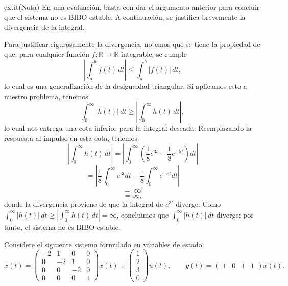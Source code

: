\documentclass[
  11pt,
  letterpaper,
   addpoints,
   answers
  ]{exam}
\begin{document}
\begin{questions}
\begin{solution}
	extit{(Nota)} En una evaluación, basta con dar el argumento anterior para concluir que el sistema no es BIBO-estable. A continuación, se justifica brevemente la divergencia de la integral.

Para justificar rigurosamente la divergencia, notemos que se tiene la propiedad de que, para cualquier función $f:\mathbb{R}\to\mathbb{R}$ integrable, se cumple
\begin{equation}
\left|\int_{a}^{b} f(t)\,dt\right|
\le
\int_{a}^{b} |f(t)|\,dt,
\end{equation}
lo cual es una generalización de la desigualdad triangular. Si aplicamos esto a nuestro problema, tenemos
\begin{equation}
\int_{0}^{\infty} |h(t)|\,dt
\ge
\left|\int_{0}^{\infty} h(t)\,dt\right|,
\end{equation}
lo cual nos entrega una cota inferior para la integral deseada. Reemplazando la respuesta al impulso en esta cota, tenemos
\begin{equation}
\left|\int_{0}^{\infty} h(t)\,dt\right|
=
\left|\int_{0}^{\infty} \left(\frac{1}{8}e^{3t}-\frac{1}{8}e^{-5t}\right) dt \right|
\end{equation}
\begin{equation}
=
\left|\frac{1}{8}\int_{0}^{\infty} e^{3t} dt - \frac{1}{8}\int_{0}^{\infty} e^{-5t} dt \right|
\end{equation}
\begin{equation}
=\left| \infty \right|
\end{equation}
\begin{equation}
=\infty,
\end{equation}
donde la divergencia proviene de que la integral de $e^{3t}$ diverge. Como $\int_{0}^{\infty} |h(t)|\,dt \ge \left|\int_{0}^{\infty} h(t)\,dt\right| = \infty$, concluimos que $\int_{0}^{\infty} |h(t)|\,dt$ diverge; por tanto, el sistema no es BIBO-estable.
\end{solution}
\question Considere el siguiente sistema formulado en variables de estado:
\begin{equation}
  \dot{x}(t) =
  \begin{pmatrix}
    -2 & 1 & 0 & 0 \\
     0 & -2 & 1 & 0 \\
     0 &  0 & -2 & 0 \\
     0 &  0 &  0 & 1
  \end{pmatrix} x(t)
  +
  \begin{pmatrix}
    1 \\
    2 \\
    3 \\
    0
  \end{pmatrix} u(t),
  \qquad
  y(t) = \begin{pmatrix} 1 & 0 & 1 & 1 \end{pmatrix} x(t).
\end{equation}


\end{questions}
\end{document}
